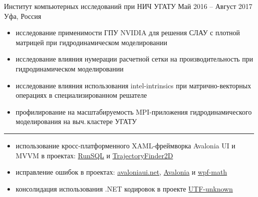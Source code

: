 \documentclass[10pt,a4paper,ragged2e,withhyper]{altacv}
\begin{document}
\begin{paracol}{2}
{Институт компьютерных исследований при НИЧ УГАТУ}
{Май 2016 -- Август 2017}
{Уфа, Россия}

\begin{itemize}

\item исследование применимости ГПУ NVIDIA для
решения СЛАУ с плотной матрицей при гидродинамическом моделировании
\smallskip

\item исследование влияния нумерации расчетной сетки на
\newline производительность при гидродинамическом моделировании
\smallskip

\item исследование влияния использования intel-intrinsics при матрично-векторных операциях в специализированном решателе
\smallskip

\item профилирование на масштабируемость  MPI-приложения
\newline гидродинамического моделирования на выч.\,кластере УГАТУ

\end{itemize}

{\color{headingrule}\rule{\linewidth}{1pt}\par}\medskip


\smallskip

\begin{itemize}

\item использование кросс-платформенного XAML-фреймворка
\newline Avalonia UI и MVVM в проектах:
\href{https://github.com/rstm-sf/RunSQL}{RunSQL} и
\href{https://github.com/rstm-sf/TrajectoryFinder2D}{TrajectoryFinder2D}
\smallskip

\item исправление ошибок в проектах:
\href{https://github.com/AvaloniaUI/avaloniaui.net/commits?author=rstm-sf}{avaloniaui.net},
\href{https://github.com/AvaloniaUI/Avalonia/commits?author=rstm-sf}{Avalonia} и
\href{https://github.com/ForNeVeR/wpf-math/commits?author=rstm-sf}{wpf-math}
\smallskip

\item консолидация использования .NET кодировок в проекте 
\href{https://github.com/CharsetDetector/UTF-unknown/commits?author=rstm-sf}{UTF-unknown}

\end{itemize}


\end{paracol}
\end{document}
